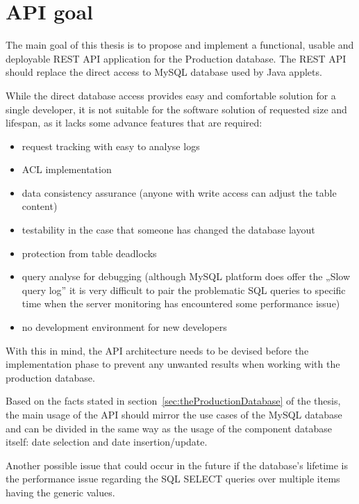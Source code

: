 \chapter{API goal}
\label{chap:apiGoal}
\par The main goal of this thesis is to propose and implement a functional, usable and deployable REST API application for the Production database. The REST API should replace the direct access to MySQL database used by Java applets.

\par While the direct database access provides easy and comfortable solution for a single developer, it is not suitable for the software solution of requested size and lifespan, as it lacks some advance features that are required:

\begin{itemize}
	\item request tracking with easy to analyse logs
	\item ACL implementation
	\item data consistency assurance (anyone with write access can adjust the table content)
	\item testability in the case that someone has changed the database layout
	\item protection from table deadlocks
	\item query analyse for debugging (although MySQL platform does offer the „Slow query log” it is very difficult to pair the problematic SQL queries to specific time when the server monitoring has encountered some performance issue)
	\item no development environment for new developers
\end{itemize}

With this in mind, the API architecture needs to be devised before the implementation phase to prevent any unwanted results when working with the production database.


\par Based on the facts stated in section~\ref{sec:theProductionDatabase} of the thesis, the main usage of the API should mirror the use cases of the MySQL database and can be divided in the same way as the usage of the component database itself: date selection and date insertion/update.


\par Another possible issue that could occur in the future if the database's lifetime is the performance issue regarding the SQL SELECT queries over multiple items having the generic values.
	
